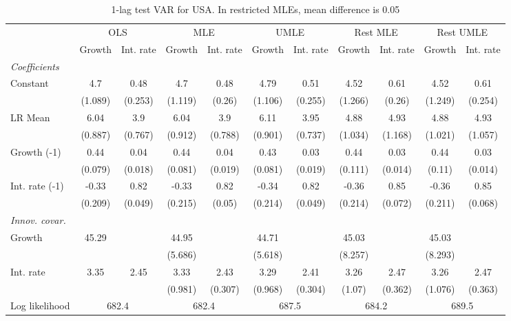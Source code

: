 \begin{table}[htbp] 
	\centering
	\begin{tabular}{@{\extracolsep{4pt}}lcccccccccc@{}}		\hline\hline
		 		 & \multicolumn{2}{c}{OLS} &\multicolumn{2}{c}{MLE} &\multicolumn{2}{c}{UMLE} &\multicolumn{2}{c}{Rest MLE} &\multicolumn{2}{c}{Rest UMLE} \\ 
 		 & Growth 	 & Int. rate 	 & Growth 	 & Int. rate 	 & Growth 	 & Int. rate 	 & Growth 	 & Int. rate 	 & Growth 	 & Int. rate\\\cline{2-3}\cline{4-5}\cline{6-7}\cline{8-9}\cline{10-11}
\rule{0pt}{4ex} 
 \emph{Coefficients} 	  		 & 		 & 		 & 		 & 		 & 		 & 		 & 		 & 		 & 		 &\\ 
\quad Constant 	 & 4.7 	 & 0.48 	 & 4.7 	 & 0.48 	 & 4.79 	 & 0.51 	 & 4.52 	 & 0.61 	 & 4.52 	 & 0.61	 \\ 
 		 & (1.089) 	 & (0.253) 	 & (1.119) 	 & (0.26) 	 & (1.106) 	 & (0.255) 	 & (1.266) 	 & (0.26) 	 & (1.249) 	 & (0.254) 	 \\ 
\quad LR Mean 	 & 6.04 	 & 3.9 	 & 6.04 	 & 3.9 	 & 6.11 	 & 3.95 	 & 4.88 	 & 4.93 	 & 4.88 	 & 4.93	 \\ 
 		 & (0.887) 	 & (0.767) 	 & (0.912) 	 & (0.788) 	 & (0.901) 	 & (0.737) 	 & (1.034) 	 & (1.168) 	 & (1.021) 	 & (1.057) 	 \\ 
\quad Growth (-1) 	 &0.44 	 & 0.04 	 & 0.44 	 & 0.04 	 & 0.43 	 & 0.03 	 & 0.44 	 & 0.03 	 & 0.44 	 & 0.03	 \\ 
 		 & (0.079) 	 & (0.018) 	 & (0.081) 	 & (0.019) 	 & (0.081) 	 & (0.019) 	 & (0.111) 	 & (0.014) 	 & (0.11) 	 & (0.014) 	 \\ 
\quad Int. rate (-1) 	 &-0.33 	 & 0.82 	 & -0.33 	 & 0.82 	 & -0.34 	 & 0.82 	 & -0.36 	 & 0.85 	 & -0.36 	 & 0.85	 \\ 
 		 & (0.209) 	 & (0.049) 	 & (0.215) 	 & (0.05) 	 & (0.214) 	 & (0.049) 	 & (0.214) 	 & (0.072) 	 & (0.211) 	 & (0.068) 	 \\ 
\rule{0pt}{4ex} \emph{Innov. covar.}  	 & 	 & 	 & 	 & 	 & 	 & 	 & 	 & 	 & 	 &\\ 
\quad Growth 	 &45.29 	 &  	 & 44.95 	 &  	 & 44.71 	 &  	 & 45.03 	 &  	 & 45.03 	 & 	 \\ 
 		 &  	 &  	 & (5.686) 	 &  	 & (5.618) 	 &  	 & (8.257) 	 &  	 & (8.293) 	 &  	 \\ 
\quad Int. rate 	 &3.35 	 & 2.45 	 & 3.33 	 & 2.43 	 & 3.29 	 & 2.41 	 & 3.26 	 & 2.47 	 & 3.26 	 & 2.47	 \\ 
 		 &  	 &  	 & (0.981) 	 & (0.307) 	 & (0.968) 	 & (0.304) 	 & (1.07) 	 & (0.362) 	 & (1.076) 	 & (0.363) 	 \\ 
 \hline \rule{0pt}{4ex} 
  Log likelihood 	 &\multicolumn{2}{c}{682.4} 	 & \multicolumn{2}{c}{682.4} 	 & \multicolumn{2}{c}{687.5} 	 & \multicolumn{2}{c}{684.2} 	 & \multicolumn{2}{c}{689.5}\\ 

 \hline 	\end{tabular}		\caption{1-lag test VAR for USA. In restricted MLEs, mean difference is 0.05}
		\label{tab:USA1}

\end{table}